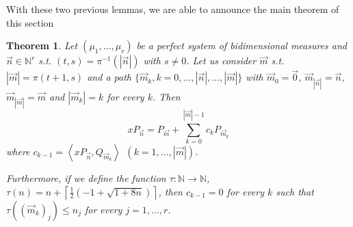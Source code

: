 \documentclass[12pt,a4]{report}
\theoremstyle{plain}
\newtheorem{theorem}{Theorem}[section]
\newcommand{\N}[0]{\mathbb{N}}
\newcommand{\prodesc}[2]{\left\langle #1 , #2 \right\rangle}
\begin{document}
    With these two previous lemmas, we are able to announce the main theorem of this section

    \begin{theorem}
        Let $(\mu_1,\dots,\mu_r)$ be a perfect system of bidimensional measures and $\vec n\in\N^r$ s.t. $(t,s)=\pi^{-1}(|\vec n|)$ with $s\neq 0$. Let us consider $\vec m$ s.t. $|\vec m| = \pi(t+1,s)$ and a path $\{\vec m_k, k=0,\dots,|\vec n|,\dots,|\vec m|\}$ with $\vec m_0=\vec 0$, $\vec m_{|\vec n|}=\vec n$, $\vec m_{|\vec m|}=\vec m$ and $|\vec m_k|=k$ for every $k$. Then
        $$
        xP_{\vec n} = P_{\vec m} + \sum_{k=0}^{|\vec m|-1}c_k P_{\vec m_k}
        $$
        where $c_{k-1}=\prodesc{xP_{\vec n}}{Q_{\vec m_k}} \ \ (k=1,\dots,|\vec m|)$.

        Furthermore, if we define the function $\tau:\N\longrightarrow\N$, $\tau(n)=n+\left\lceil \frac 1 2 (-1 + \sqrt{1+8n})\right\rceil$, then $c_{k-1} = 0$ for every $k$ such that $\tau((\vec m_k)_j) \leq n_j$ for every $j=1,\dots,r$.
    \end{theorem}
\end{document}
